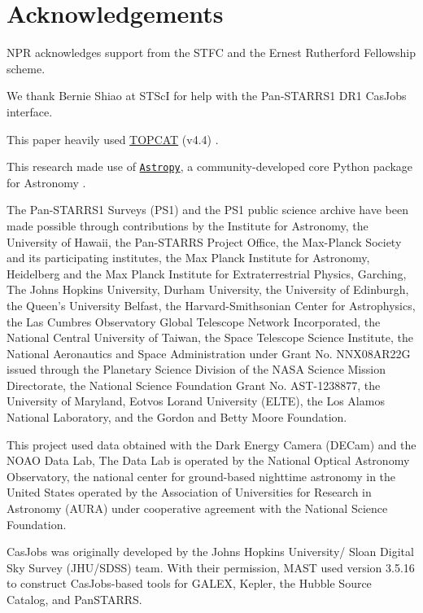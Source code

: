 \documentclass[usenatbib]{mnras}
\begin{document}
\section*{Acknowledgements}
NPR acknowledges support from the STFC and the Ernest Rutherford Fellowship scheme. 

We thank Bernie Shiao at STScI for help with the Pan-STARRS1 DR1 CasJobs interface. 

This paper heavily used \href{http://www.star.bris.ac.uk/~mbt/topcat/}{TOPCAT} (v4.4)
\citep[][]{Taylor2005, Taylor2011}.

This research made use of \href{http://www.astropy.org}{\tt Astropy}, 
a community-developed core Python package for Astronomy 
\citep{AstropyCollaboration2013, AstropyCollaboration2018}. 

The Pan-STARRS1 Surveys (PS1) and the PS1 public science archive have
been made possible through contributions by the Institute for
Astronomy, the University of Hawaii, the Pan-STARRS Project Office,
the Max-Planck Society and its participating institutes, the Max
Planck Institute for Astronomy, Heidelberg and the Max Planck
Institute for Extraterrestrial Physics, Garching, The Johns Hopkins
University, Durham University, the University of Edinburgh, the
Queen's University Belfast, the Harvard-Smithsonian Center for
Astrophysics, the Las Cumbres Observatory Global Telescope Network
Incorporated, the National Central University of Taiwan, the Space
Telescope Science Institute, the National Aeronautics and Space
Administration under Grant No. NNX08AR22G issued through the Planetary
Science Division of the NASA Science Mission Directorate, the National
Science Foundation Grant No. AST-1238877, the University of Maryland,
Eotvos Lorand University (ELTE), the Los Alamos National Laboratory,
and the Gordon and Betty Moore Foundation.

This project used data obtained with the Dark Energy Camera (DECam)
and the NOAO Data Lab, The Data Lab is operated by the National
Optical Astronomy Observatory, the national center for ground-based
nighttime astronomy in the United States operated by the Association
of Universities for Research in Astronomy (AURA) under cooperative
agreement with the National Science Foundation.

CasJobs was originally developed by the Johns Hopkins University/
Sloan Digital Sky Survey (JHU/SDSS) team. With their permission, MAST
used version 3.5.16 to construct CasJobs-based tools for GALEX,
Kepler, the Hubble Source Catalog, and PanSTARRS.
\end{document}
